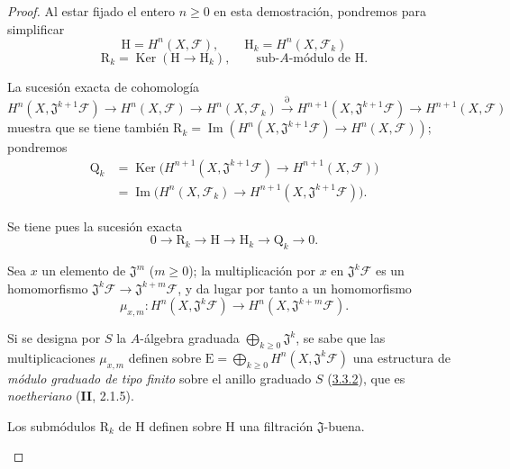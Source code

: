 \begin{proof}
Al estar fijado el entero $n\geq0$ en esta demostración, pondremos para
simplificar
\[
\mathrm H=H^n(X,\mathcal F),\qquad
\mathrm H_k=H^n(X,\mathcal F_k)
\tag{4.1.7.3}\label{III.4.1.7.3-fr}
\]
\[
\mathrm R_k=\operatorname{Ker}(\mathrm H\longrightarrow\mathrm H_k),
\qquad\text{sub-$A$-módulo de $\mathrm H$.}
\tag{4.1.7.4}\label{III.4.1.7.4-fr}
\]

La sucesión exacta de cohomología
\[
H^n(X,\mathfrak J^{k+1}\mathcal F)\longrightarrow H^n(X,\mathcal F)
\longrightarrow H^n(X,\mathcal F_k)\xrightarrow{\partial}
H^{n+1}(X,\mathfrak J^{k+1}\mathcal F)
\longrightarrow H^{n+1}(X,\mathcal F)
\]
muestra que se tiene también
$\mathrm R_k=\operatorname{Im}(
H^n(X,\mathfrak J^{k+1}\mathcal F)\longrightarrow H^n(X,\mathcal F)
)$;
pondremos
\[
\begin{aligned}
\mathrm Q_k
&=\operatorname{Ker}\bigl(H^{n+1}(X,\mathfrak J^{k+1}\mathcal F)
\longrightarrow H^{n+1}(X,\mathcal F)\bigr)\\
&=\operatorname{Im}\bigl(H^n(X,\mathcal F_k)
\longrightarrow H^{n+1}(X,\mathfrak J^{k+1}\mathcal F)\bigr).
\end{aligned}
\tag{4.1.7.5}\label{III.4.1.7.5-fr}
\]

Se tiene pues la sucesión exacta
\[
0\longrightarrow\mathrm R_k\longrightarrow\mathrm H
\longrightarrow\mathrm H_k\longrightarrow\mathrm Q_k\longrightarrow0.
\tag{4.1.7.6}\label{III.4.1.7.6-fr}
\]

\begin{env}[4.1.7.7]
\label{III.4.1.7.7-fr}
Sea $x$ un elemento de $\mathfrak J^m$ ($m\geq0$); la multiplicación por
$x$ en $\mathfrak J^k\mathcal F$ es un homomorfismo
$\mathfrak J^k\mathcal F\to\mathfrak J^{k+m}\mathcal F$, y da lugar
por tanto a un homomorfismo
\[
\mu_{x,m}:H^n(X,\mathfrak J^k\mathcal F)
\longrightarrow H^n(X,\mathfrak J^{k+m}\mathcal F).
\tag{4.1.7.8}\label{III.4.1.7.8-fr}
\]

Si se designa por $S$ la $A$-álgebra graduada
$\bigoplus_{k\geq0}\mathfrak J^k$, se sabe que las multiplicaciones
$\mu_{x,m}$ definen sobre
$\mathrm E=\bigoplus_{k\geq0}H^n(X,\mathfrak J^k\mathcal F)$ una
estructura de \emph{módulo graduado de tipo finito} sobre el anillo graduado $S$
(\hyperref[III.3.3.2-fr]{3.3.2}), que es \emph{noetheriano} (\textbf{II}, 2.1.5).
\end{env}

\begin{lemma}[4.1.7.9]
\label{III.4.1.7.9-fr}
Los submódulos $\mathrm R_k$ de $\mathrm H$ definen sobre $\mathrm H$
una filtración $\mathfrak J$-buena.
\end{lemma}


\end{proof}
